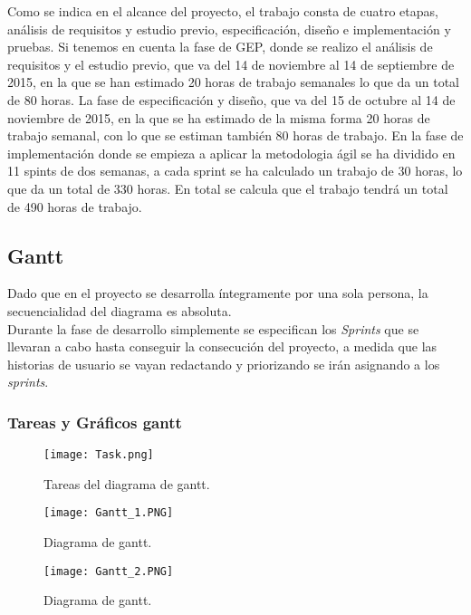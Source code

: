 Como se indica en el alcance del proyecto, el trabajo consta de cuatro etapas, análisis de requisitos y estudio previo, especificación, diseño e implementación y pruebas. 
Si tenemos en cuenta la fase de GEP, donde se realizo el análisis de requisitos y el estudio previo, que va del 14 de noviembre al 14 de septiembre de 2015, en la que se han estimado 20 horas de trabajo semanales lo que da un total de 80 horas.
La fase de especificación y diseño, que va del 15 de octubre al 14 de noviembre de 2015, en la que se ha estimado de la misma forma 20 horas de trabajo semanal, con lo que se estiman también 80 horas de trabajo.
En la fase de implementación donde se empieza a aplicar la metodologia ágil se ha dividido en 11 spints de dos semanas, a cada sprint se ha calculado un trabajo de 30 horas, lo que da un total de 330 horas.
En total se calcula que el trabajo tendrá un total de 490 horas de trabajo.


\subsection{Gantt}
Dado que en el proyecto se desarrolla íntegramente por una sola persona, la secuencialidad del diagrama es absoluta.
\\ Durante la fase de desarrollo simplemente se especifican los \textit{Sprints} que se llevaran a cabo hasta conseguir la consecución del proyecto, a medida que las historias de usuario se vayan redactando y priorizando se irán asignando a los \textit{sprints}.


\begin{landscape}
\subsubsection{Tareas y Gráficos gantt}
\begin{figure}[ht!]
\center
\texttt{[image: Task.png]}
\caption{Tareas del diagrama de gantt.}
\label{fig:task}
\end{figure}
\newpage

\begin{figure}[ht!]
\center
\texttt{[image: Gantt\_1.PNG]}
\caption{Diagrama de gantt.}
\label{fig:gantt_1}
\end{figure}

\begin{figure}[ht!]
\center
\texttt{[image: Gantt\_2.PNG]}
\caption{Diagrama de gantt.}
\label{fig:gantt_2}
\end{figure}

\end{landscape}
\newpage

